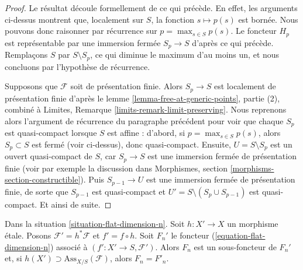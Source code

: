 \begin{proof}
\medskip\noindent
Le résultat découle formellement de ce qui précède.
En effet, les arguments ci-dessus montrent que, localement sur $S$, la fonction
$s \mapsto p(s)$ est bornée. Nous pouvons donc raisonner par récurrence
sur $p = \max_{s \in S} p(s)$. Le foncteur $H_p$ est représentable
par une immersion fermée $S_p \to S$ d'après ce qui précède. Remplaçons $S$ par
$S \setminus S_p$, ce qui diminue le maximum d'au moins un, et
nous concluons par l'hypothèse de récurrence.

\medskip\noindent
Supposons que $\mathcal{F}$ soit de présentation finie.
Alors $S_p \to S$ est localement de présentation finie d'après le
lemme \ref{lemma-free-at-generic-points}, partie (2), combiné à
Limites, Remarque \ref{limits-remark-limit-preserving}.
Nous reprenons alors l'argument de récurrence du paragraphe précédent pour
voir que chaque $S_p$ est quasi-compact lorsque $S$ est affine :
d'abord, si $p = \max_{s \in S} p(s)$, alors $S_p \subset S$
est fermé (voir ci-dessus), donc quasi-compact. Ensuite, $U = S \setminus S_p$
est un ouvert quasi-compact de $S$, car $S_p \to S$ est une immersion
fermée de présentation finie (voir par exemple la discussion dans Morphismes, section
\ref{morphisms-section-constructible}). Puis $S_{p - 1} \to U$
est une immersion fermée de présentation finie, de sorte que $S_{p - 1}$
est quasi-compact et $U' = S \setminus (S_p \cup S_{p - 1})$
est quasi-compact. Et ainsi de suite.
\end{proof}

\begin{lemma}
\label{lemma-localize-flat-dimension-n}
Dans la situation \ref{situation-flat-dimension-n}.
Soit $h : X' \to X$ un morphisme \'etale.
Posons $\mathcal{F}' = h^*\mathcal{F}$ et $f' = f \circ h$.
Soit $F_n'$ le foncteur (\ref{equation-flat-dimension-n})
associé à $(f' : X' \to S, \mathcal{F}')$.
Alors $F_n$ est un sous-foncteur de $F_n'$ et, si
$h(X') \supset \text{Ass}_{X/S}(\mathcal{F})$, alors $F_n = F'_n$.
\end{lemma}

